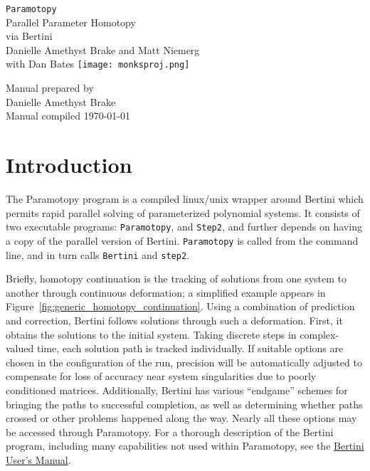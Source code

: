 


	\pagestyle{plain} 
	\setcounter{page}{1}




\thispagestyle{empty}
\begin{center}
{\LARGE \tt Paramotopy}\\[\baselineskip]
Parallel Parameter Homotopy \\ via Bertini \\
\vskip0.5in
Danielle Amethyst Brake and Matt Niemerg  \\
with Dan Bates
\vfill%
\texttt{[image: monksproj.png]}

\end{center}
\null
\vfill
\begin{singlespace}
Manual prepared by\\
Danielle Amethyst Brake\\
 \hfill Manual compiled \today
\end{singlespace}
\newpage





	\tableofcontents
	\eject
	\setcounter{page}{1}
	\eject




\section{Introduction}

The Paramotopy program is a compiled linux/unix wrapper around Bertini which permits rapid parallel solving of parameterized polynomial systems.  It consists of two executable programs: \texttt{Paramotopy}, and \texttt{Step2}, and further depends on having a copy of the parallel version of Bertini.  \texttt{Paramotopy} is called from the command line, and in turn calls \texttt{Bertini} and \texttt{step2}.

Briefly, homotopy continuation is the tracking of solutions from one system to another through continuous deformation; a simplified example appears in Figure~\ref{fig:generic_homotopy_continuation}.  Using a combination of prediction and correction, Bertini follows solutions through such a deformation.  First, it obtains the solutions to the initial system.  Taking discrete steps in complex-valued time, each solution path is tracked individually.  If suitable options are chosen in the configuration of the run, precision will be automatically adjusted to compensate for loss of accuracy near system singularities due to poorly conditioned matrices.  Additionally, Bertini has various ``endgame'' schemes for bringing the paths to successful completion, as well as determining whether paths crossed or other problems happened along the way.  Nearly all these options may be accessed through Paramotopy.  For a thorough description of the Bertini program, including many capabilities not used within Paramotopy, see the \href{http://www.nd.edu/~sommese/bertini/BertiniUsersManual.pdf}{Bertini User's Manual}.



